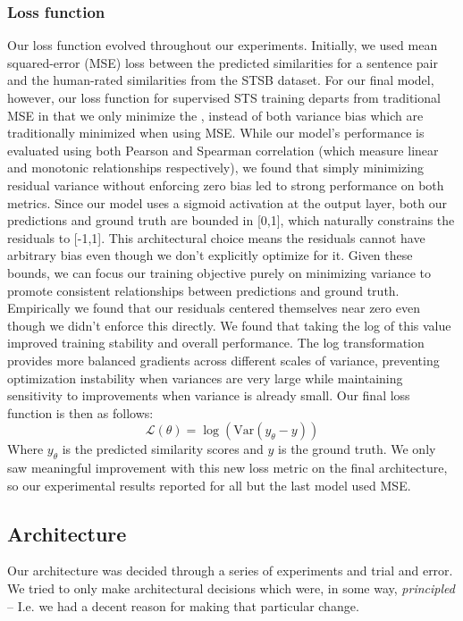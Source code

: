 \documentclass{article}
\begin{document}
\subsubsection{Loss function}
Our loss function evolved throughout our experiments. Initially, we used mean squared-error (MSE) loss between the predicted similarities for a sentence pair and the human-rated similarities from the STSB dataset. For our final model, however, our loss function for supervised STS training departs from traditional MSE in that we only minimize the , instead of both variance  bias which are traditionally minimized when using MSE. While our model's performance is evaluated using both Pearson and Spearman correlation (which measure linear and monotonic relationships respectively), we found that simply minimizing residual variance without enforcing zero bias led to strong performance on both metrics. Since our model uses a sigmoid activation at the output layer, both our predictions and ground truth are bounded in [0,1], which naturally constrains the residuals to [-1,1]. This architectural choice means the residuals cannot have arbitrary bias even though we don't explicitly optimize for it. Given these bounds, we can focus our training objective purely on minimizing variance to promote consistent relationships between predictions and ground truth. Empirically we found that our residuals centered themselves near zero even though we didn't enforce this directly. We found that taking the log of this value improved training stability and overall performance. The log transformation provides more balanced gradients across different scales of variance, preventing optimization instability when variances are very large while maintaining sensitivity to improvements when variance is already small. Our final loss function is then as follows:
$$
\mathcal{L}(\theta) = \log(\text{Var}(y_\theta - y))
$$
Where $y_\theta$ is the predicted similarity scores and $y$ is the ground truth. We only saw meaningful improvement with this new loss metric on the final architecture, so our experimental results reported for all but the last model used MSE.

\subsection{Architecture} \label{Architecture}
Our architecture was decided through a series of experiments and trial and error. We tried to only make architectural decisions which were, in some way, \textit{principled} -- I.e. we had a decent reason for making that particular change.
\end{document}
